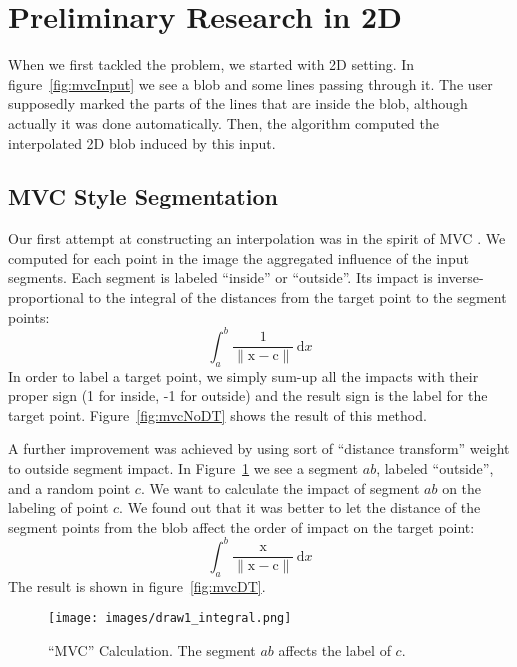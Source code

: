 \section{Preliminary Research in 2D}
\label{sec:preliminary}
When we first tackled the problem, we started with 2D setting.
In figure~\ref{fig:mvcInput} we see a blob and some lines passing through it.
The user supposedly marked the parts of the lines that are inside the blob, although actually it was done automatically.
Then, the algorithm computed the interpolated 2D blob induced by this input.


\subsection{MVC Style Segmentation}

Our first attempt at constructing an interpolation was in the spirit of MVC \cite{Floater200319}.
We computed for each point in the image the aggregated influence of the input segments.
Each segment is labeled ``inside'' or ``outside''. 
Its impact is inverse-proportional to the integral of the distances from the target point to the segment points:
\[
\int_a^b \mathrm{\frac{1}{\|x-c\|}} \,\mathrm{d}x
\]
In order to label a target point, we simply sum-up all the impacts with their proper sign (1 for inside, -1 for outside) and the result sign is the label for the target point.
Figure~\ref{fig:mvcNoDT} shows the result of this method.

A further improvement was achieved by using sort of ``distance transform'' weight to outside segment impact.
In Figure~\ref{fig:mvcIntegral} we see a segment $ab$, labeled ``outside'', and a random point $c$.
We want to calculate the impact of segment $ab$ on the labeling of point $c$.
We found out that it was better to let the distance of the segment points from the blob affect the order of impact on the target point:
\[
\int_a^b \mathrm{\frac{x}{\|x-c\|}} \,\mathrm{d}x 
\]
The result is shown in figure~\ref{fig:mvcDT}.

\begin{figure}[ht]
\centering
  \texttt{[image: images/draw1\_integral.png]}
  \caption[``MVC'' Calculation]{
  ``MVC'' Calculation.  The segment $ab$ affects the label of $c$.
  }\label{fig:mvcIntegral}
\end{figure}


\clearpage

\iffalse

